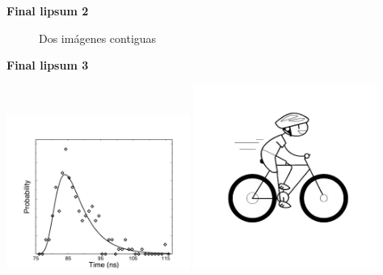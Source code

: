 \documentclass{article}
\begin{document}
\lipsum

{\bf Final lipsum 2}

\begin{figure}
    \centering
    \caption{Dos imágenes contiguas}
    \label{fig:2}
\end{figure}
\lipsum

{\bf Final lipsum 3}

    \includegraphics[trim= 0mm 0mm 0mm 30mm,clip,angle=0,width=0.45\textwidth]{graficos/fig_9Vis.pdf}
    \includegraphics[trim= 0mm 15mm 0mm 5mm,clip,width=0.45\textwidth]{graficos/ciclista.png}
\lipsum
\end{document}
